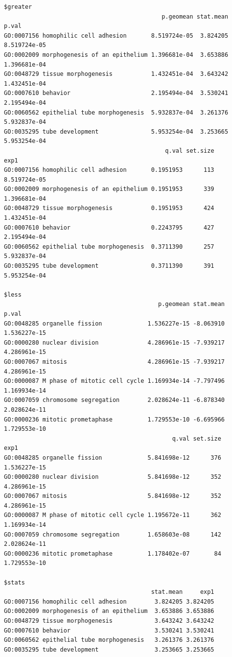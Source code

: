 \documentclass[
  letterpaper,
  DIV=11,
  numbers=noendperiod]{scrartcl}
\begin{document}
\begin{verbatim}
$greater
                                             p.geomean stat.mean        p.val
GO:0007156 homophilic cell adhesion       8.519724e-05  3.824205 8.519724e-05
GO:0002009 morphogenesis of an epithelium 1.396681e-04  3.653886 1.396681e-04
GO:0048729 tissue morphogenesis           1.432451e-04  3.643242 1.432451e-04
GO:0007610 behavior                       2.195494e-04  3.530241 2.195494e-04
GO:0060562 epithelial tube morphogenesis  5.932837e-04  3.261376 5.932837e-04
GO:0035295 tube development               5.953254e-04  3.253665 5.953254e-04
                                              q.val set.size         exp1
GO:0007156 homophilic cell adhesion       0.1951953      113 8.519724e-05
GO:0002009 morphogenesis of an epithelium 0.1951953      339 1.396681e-04
GO:0048729 tissue morphogenesis           0.1951953      424 1.432451e-04
GO:0007610 behavior                       0.2243795      427 2.195494e-04
GO:0060562 epithelial tube morphogenesis  0.3711390      257 5.932837e-04
GO:0035295 tube development               0.3711390      391 5.953254e-04

$less
                                            p.geomean stat.mean        p.val
GO:0048285 organelle fission             1.536227e-15 -8.063910 1.536227e-15
GO:0000280 nuclear division              4.286961e-15 -7.939217 4.286961e-15
GO:0007067 mitosis                       4.286961e-15 -7.939217 4.286961e-15
GO:0000087 M phase of mitotic cell cycle 1.169934e-14 -7.797496 1.169934e-14
GO:0007059 chromosome segregation        2.028624e-11 -6.878340 2.028624e-11
GO:0000236 mitotic prometaphase          1.729553e-10 -6.695966 1.729553e-10
                                                q.val set.size         exp1
GO:0048285 organelle fission             5.841698e-12      376 1.536227e-15
GO:0000280 nuclear division              5.841698e-12      352 4.286961e-15
GO:0007067 mitosis                       5.841698e-12      352 4.286961e-15
GO:0000087 M phase of mitotic cell cycle 1.195672e-11      362 1.169934e-14
GO:0007059 chromosome segregation        1.658603e-08      142 2.028624e-11
GO:0000236 mitotic prometaphase          1.178402e-07       84 1.729553e-10

$stats
                                          stat.mean     exp1
GO:0007156 homophilic cell adhesion        3.824205 3.824205
GO:0002009 morphogenesis of an epithelium  3.653886 3.653886
GO:0048729 tissue morphogenesis            3.643242 3.643242
GO:0007610 behavior                        3.530241 3.530241
GO:0060562 epithelial tube morphogenesis   3.261376 3.261376
GO:0035295 tube development                3.253665 3.253665
\end{verbatim}
\end{document}
